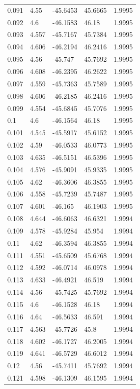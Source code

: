 \begin{tabular}{lllll}
0.091 & 4.55 & -45.6453 & 45.6665 & 1.9995 \\
0.092 & 4.6 & -46.1583 & 46.18 & 1.9995 \\
0.093 & 4.557 & -45.7167 & 45.7384 & 1.9995 \\
0.094 & 4.606 & -46.2194 & 46.2416 & 1.9995 \\
0.095 & 4.56 & -45.747 & 45.7692 & 1.9995 \\
0.096 & 4.608 & -46.2395 & 46.2622 & 1.9995 \\
0.097 & 4.559 & -45.7363 & 45.7589 & 1.9995 \\
0.098 & 4.606 & -46.2185 & 46.2416 & 1.9995 \\
0.099 & 4.554 & -45.6845 & 45.7076 & 1.9995 \\
0.1 & 4.6 & -46.1564 & 46.18 & 1.9995 \\
0.101 & 4.545 & -45.5917 & 45.6152 & 1.9995 \\
0.102 & 4.59 & -46.0533 & 46.0773 & 1.9995 \\
0.103 & 4.635 & -46.5151 & 46.5396 & 1.9995 \\
0.104 & 4.576 & -45.9091 & 45.9335 & 1.9995 \\
0.105 & 4.62 & -46.3606 & 46.3855 & 1.9995 \\
0.106 & 4.558 & -45.7239 & 45.7487 & 1.9995 \\
0.107 & 4.601 & -46.165 & 46.1903 & 1.9995 \\
0.108 & 4.644 & -46.6063 & 46.6321 & 1.9994 \\
0.109 & 4.578 & -45.9284 & 45.954 & 1.9994 \\
0.11 & 4.62 & -46.3594 & 46.3855 & 1.9994 \\
0.111 & 4.551 & -45.6509 & 45.6768 & 1.9994 \\
0.112 & 4.592 & -46.0714 & 46.0978 & 1.9994 \\
0.113 & 4.633 & -46.4921 & 46.519 & 1.9994 \\
0.114 & 4.56 & -45.7425 & 45.7692 & 1.9994 \\
0.115 & 4.6 & -46.1528 & 46.18 & 1.9994 \\
0.116 & 4.64 & -46.5633 & 46.591 & 1.9994 \\
0.117 & 4.563 & -45.7726 & 45.8 & 1.9994 \\
0.118 & 4.602 & -46.1727 & 46.2005 & 1.9994 \\
0.119 & 4.641 & -46.5729 & 46.6012 & 1.9994 \\
0.12 & 4.56 & -45.7411 & 45.7692 & 1.9994 \\
0.121 & 4.598 & -46.1309 & 46.1595 & 1.9994 \\

\end{tabular}
